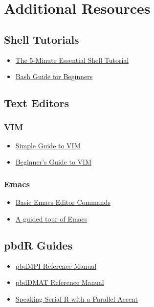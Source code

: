 \section{Additional Resources}


\subsection{Shell Tutorials}

\begin{itemize}
  \item \href{http://community.linuxmint.com/tutorial/view/100}{The 5-Minute Essential Shell Tutorial}
  \item \href{http://tldp.org/LDP/Bash-Beginners-Guide/html/}{Bash Guide for Beginners}
\end{itemize}


\subsection{Text Editors}

\subsubsection{VIM}

\begin{itemize}
  \item \href{http://www.linuxhelp.net/guides/vim/}{Simple Guide to VIM}
  \item \href{http://newbiedoc.sourceforge.net/text_editing/vim.html.en}{Beginner's Guide to VIM}
\end{itemize}

\subsubsection{Emacs}

\begin{itemize}
  \item \href{http://www.cs.colostate.edu/helpdocs/emacs.html}{Basic Emacs Editor Commands}
  \item \href{https://www.gnu.org/software/emacs/tour/}{A guided tour of Emacs}
\end{itemize}



\subsection{pbdR Guides}

\begin{itemize}
  \item \href{http://cran.r-project.org/web/packages/pbdMPI/pbdMPI.pdf}{pbdMPI Reference Manual}
  \item \href{http://cran.r-project.org/web/packages/pbdDMAT/pbdDMAT.pdf}{pbdDMAT Reference Manual}
  \item \href{http://cran.r-project.org/web/packages/pbdDEMO/vignettes/pbdDEMO-guide.pdf}{Speaking Serial R with a Parallel Accent}
\end{itemize}

